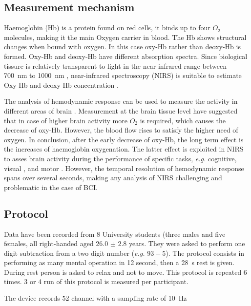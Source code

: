 \documentclass[preprint,12pt]{elsarticle}
\begin{document}
\subsection{Measurement mechanism}
Haemoglobin (Hb) is a protein found on red cells, it binds up to four $O_2$ molecules, making it the main  Oxygen carrier in blood. The Hb shows structural changes when bound with oxygen. In this case oxy-Hb  rather than deoxy-Hb is formed. Oxy-Hb and deoxy-Hb have different absorption spectra. Since biological tissure is relatively  transparent to light  in the near-infrared range between \SI{700}{\nano\meter} to \SI{1000}{\nano\meter} \cite{jobsis1977noninvasive},  near-infrared spectroscopy (NIRS)  is  suitable to  estimate  Oxy-Hb and deoxy-Hb concentration \cite{villringer1997non}.  

The analysis of hemodynamic response can be used to measure the activity in different areas of brain \cite{buxton2004modeling}. Measurement at the brain tissue level  \cite{malonek1996interactions} have suggested  that in case of higher brain activity more $O_2$ is required, which causes the decrease of oxy-Hb. However, the blood flow rises  to satisfy the higher need of oxygen. In conclusion, after the early decrease of oxy-Hb, the long term effect is the   increases of haemoglobin oxygenation. The latter effect is exploited in NIRS to asses brain activity during the performance of specific tasks, \textit{e.g.} cognitive\cite{franceschini2003hemodynamic}, visual \cite{herrmann2005near}, and motor \cite{wriessnegger2008spatio}.
However, the temporal resolution of hemodynamic response spans over several seconds, making any analysis of NIRS challenging and problematic in the case of BCI.

\subsection{Protocol}
Data  have been recorded from 8  University  students (three males and five females, all right-handed aged 26.0 $\pm$ 2.8 years. They were asked to perform one digit subtraction from a two digit number (\textit{e.g.} $93-5$). The protocol consists in  performing as many mental operation in 12 second, then  a \SI{28}{\second} rest is given. During rest person is asked to relax and not to move. This protocol is repeated 6 times. 3 or 4 run of this protocol is measured per participant.

The device records 52 channel with a sampling rate of \SI{10}{\hertz}
\end{document}
